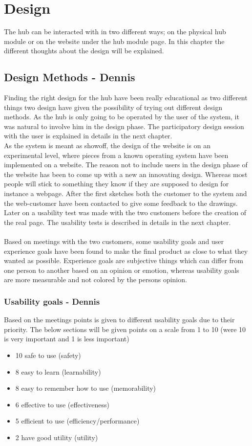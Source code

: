 \chapter{Design}
The  hub can be interacted with in two different ways; on the physical hub module or on the website under the hub module page. In this chapter the different thoughts about the design will be explained.
\section{Design Methods - Dennis}
Finding the right design for the hub have been really educational as two different things two design have given the possibility of trying out different design methods. As the hub is only going to be operated by the user of the system, it was natural to involve him in the design phase. The participatory design session with the user is explained in details in the next chapter.
\\As the system is meant as showoff, the design of the website is on an experimental level, where pieces from a known operating system have been implemented on a website. The reason not to include users in the design phase of the website has been to come up with a new an innovating design. Whereas most people will stick to something they know if they are supposed to design for instance a webpage. After the first sketches both the customer to the system and the web-customer have been contacted to give some feedback to the drawings. Later on a usability test was made with the two customers before the creation of the real page. The usability tests is described in details in the next chapter.
\\ \\
Based on meetings with the two customers, some usability goals and user experience goals have been found to make the final product as close to what they wanted as possible. Experience goals are subjective things which can differ from one person to another based on an opinion or emotion, whereas usability goals are more measurable and not colored by the persons opinion.
\subsection{Usability goals - Dennis}
Based on the meetings points is given to different usability goals due to their priority. 
The below sections will be given points on a scale from 1 to 10 (were 10 is very important and 1 is less important)
\begin{itemize}
	\item 10 safe to use (safety)
	\item 8 easy to learn (learnability) 
	\item 8 easy to remember how to use (memorability)
	\item 6 effective to use (effectiveness) 
	\item 5 efficient to use (efficiency/performance)
	\item 2 have good utility (utility)	
\end{itemize}
